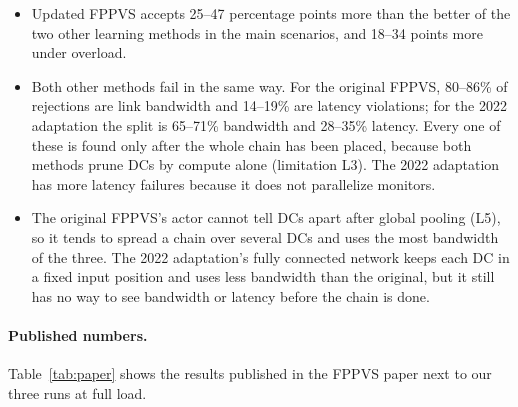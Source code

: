 \begin{itemize}
  \item Updated FPPVS accepts 25--47 percentage points more than the better of
  the two other learning methods in the main scenarios, and 18--34 points more
  under overload.
  \item Both other methods fail in the same way. For the original FPPVS, 80--86\%
  of rejections are link bandwidth and 14--19\% are latency violations; for the
  2022 adaptation the split is 65--71\% bandwidth and 28--35\% latency. Every one
  of these is found only after the whole chain has been placed, because both
  methods prune DCs by compute alone (limitation L3). The 2022 adaptation has more
  latency failures because it does not parallelize monitors.
  \item The original FPPVS's actor cannot tell DCs apart after global pooling
  (L5), so it tends to spread a chain over several DCs and uses the most
  bandwidth of the three. The 2022 adaptation's fully connected network keeps
  each DC in a fixed input position and uses less bandwidth than the original,
  but it still has no way to see bandwidth or latency before the chain is done.
\end{itemize}

\paragraph{Published numbers.} Table~\ref{tab:paper} shows the results published
in the FPPVS paper next to our three runs at full load.

\begin{table}[H]
\centering\small
\caption{Published FPPVS results (Tables 6 and 7 of the paper) next to our runs
of the original FPPVS, the 2022 adaptation and updated FPPVS at load 1.0. Values
come from different data and settings; see the text before comparing them.}
\label{tab:paper}

\end{table}

